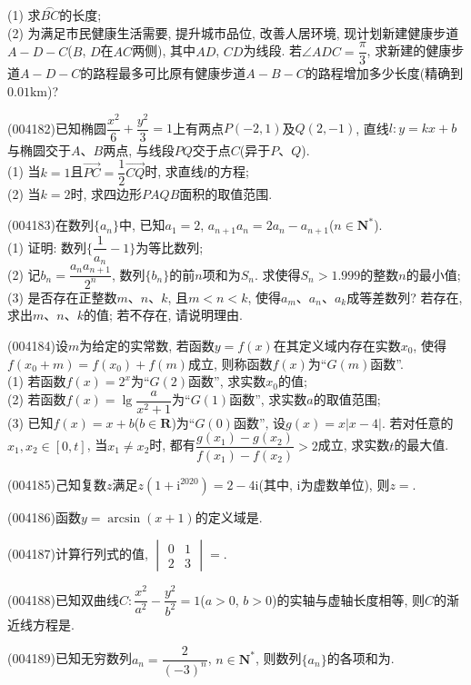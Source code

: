 (1) 求$\overset\frown{BC}$的长度;\\
(2) 为满足市民健康生活需要, 提升城市品位, 改善人居环境, 现计划新建健康步道$A-D-C$($B$, $D$在$AC$两侧), 其中$AD$, $CD$为线段. 若$\angle ADC=\dfrac{\pi}3$, 求新建的健康步道$A-D-C$的路程最多可比原有健康步道$A-B-C$的路程增加多少长度(精确到$0.01\text{km}$)?
\item (004182)已知椭圆$\dfrac{x^2}{6}+\dfrac{y^2}{3}=1$上有两点$P(-2,1)$及$Q(2,-1)$, 直线$l:y=kx+b$与椭圆交于$A$、$B$两点, 与线段$PQ$交于点$C$(异于$P$、$Q$).\\
(1) 当$k=1$且$\overrightarrow{PC}=\dfrac 12\overrightarrow{CQ}$时, 求直线$l$的方程;\\
(2) 当$k=2$时, 求四边形$PAQB$面积的取值范围.
\item (004183)在数列$\{a_n\}$中, 已知$a_1=2$, $a_{n+1}a_n=2a_n-a_{n+1}$($n\in \mathbf{N}^*$).\\
(1) 证明: 数列$\{\dfrac 1{a_n}-1\}$为等比数列;\\
(2) 记$b_n=\dfrac{a_na_{n+1}}{2^n}$, 数列$\{b_n\}$的前$n$项和为$S_n$. 求使得$S_n>1.999$的整数$n$的最小值;\\
(3) 是否存在正整数$m$、$n$、$k$, 且$m<n<k$, 使得$a_m$、$a_n$、$a_k$成等差数列? 若存在, 求出$m$、$n$、$k$的值; 若不存在, 请说明理由.
\item (004184)设$m$为给定的实常数, 若函数$y=f(x)$在其定义域内存在实数$x_0$, 使得$f(x_0+m)=f(x_0)+f(m)$成立, 则称函数$f(x)$为``$G(m)$函数''.\\
(1) 若函数$f(x)=2^x$为``$G(2)$函数'', 求实数$x_0$的值;\\
(2) 若函数$f(x)=\lg \dfrac a{x^2+1}$为``$G(1)$函数'', 求实数$a$的取值范围;\\
(3) 已知$f(x)=x+b$($b\in \mathbf{R}$)为``$G(0)$函数'', 设$g(x)=x|x-4|$. 若对任意的$x_1,x_2\in[0,t]$, 当$x_1\ne x_2$时, 都有$\dfrac{g(x_1)-g(x_2)}{f(x_1)-f(x_2)}>2$成立, 求实数$t$的最大值.
\item (004185)己知复数$z$满足$z(1+\mathrm{i}^{2020})=2-4\mathrm{i}$(其中, $\mathrm{i}$为虚数单位), 则$z=$.
\item (004186)函数$y=\arcsin (x+1)$的定义域是.
\item (004187)计算行列式的值, $\begin{vmatrix}0 & 1  \\2 & 3  \end{vmatrix}=$.
\item (004188)已知双曲线$C:\dfrac{x^2}{a^2}-\dfrac{y^2}{b^2}=1$($a>0$, $b>0$)的实轴与虚轴长度相等, 则$C$的渐近线方程是.
\item (004189)已知无穷数列$a_n=\dfrac 2{(-3)^n}$, $n\in \mathbf{N}^*$, 则数列$\{a_n\}$的各项和为.
